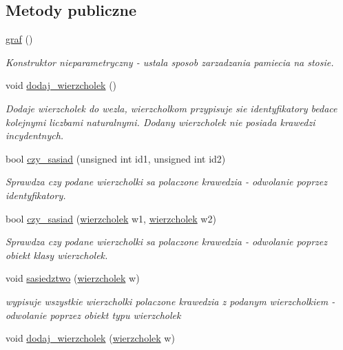 \subsection*{Metody publiczne}
\begin{DoxyCompactItemize}
\item 
\hyperlink{classgraf_a6dc94b859678110f1bc85095a55bbee4}{graf} ()
\begin{DoxyCompactList}\small\item\em Konstruktor nieparametryczny -\/ ustala sposob zarzadzania pamiecia na stosie. \end{DoxyCompactList}\item 
void \hyperlink{classgraf_afaa55f5a9aef1f30a2b3be97b59a476b}{dodaj\-\_\-wierzcholek} ()
\begin{DoxyCompactList}\small\item\em Dodaje wierzcholek do wezla, wierzcholkom przypisuje sie identyfikatory bedace kolejnymi liczbami naturalnymi. Dodany wierzcholek nie posiada krawedzi incydentnych. \end{DoxyCompactList}\item 
bool \hyperlink{classgraf_a699329f1a383e2a5816e969498af6eb4}{czy\-\_\-sasiad} (unsigned int id1, unsigned int id2)
\begin{DoxyCompactList}\small\item\em Sprawdza czy podane wierzcholki sa polaczone krawedzia -\/ odwolanie poprzez identyfikatory. \end{DoxyCompactList}\item 
bool \hyperlink{classgraf_a617db5b49d65cd716b24c8b4930dec2a}{czy\-\_\-sasiad} (\hyperlink{classwierzcholek}{wierzcholek} w1, \hyperlink{classwierzcholek}{wierzcholek} w2)
\begin{DoxyCompactList}\small\item\em Sprawdza czy podane wierzcholki sa polaczone krawedzia -\/ odwolanie poprzez obiekt klasy wierzcholek. \end{DoxyCompactList}\item 
void \hyperlink{classgraf_ac72411b348f0025613cb03eeb27b9594}{sasiedztwo} (\hyperlink{classwierzcholek}{wierzcholek} w)
\begin{DoxyCompactList}\small\item\em wypisuje wszystkie wierzcholki polaczone krawedzia z podanym wierzcholkiem -\/ odwolanie poprzez obiekt typu wierzcholek \end{DoxyCompactList}\item 
void \hyperlink{classgraf_abe2f98850133e73015ab8232d90d7530}{dodaj\-\_\-wierzcholek} (\hyperlink{classwierzcholek}{wierzcholek} w)

\end{DoxyCompactItemize}
